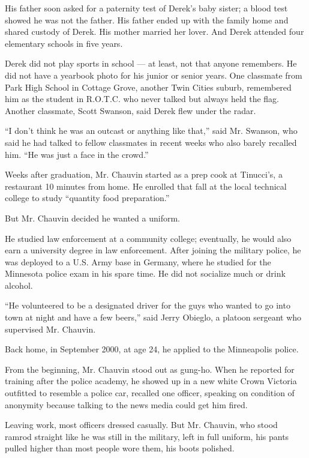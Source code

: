His father soon asked for a paternity test of Derek's baby sister; a
blood test showed he was not the father. His father ended up with the
family home and shared custody of Derek. His mother married her lover.
And Derek attended four elementary schools in five years.

Derek did not play sports in school --- at least, not that anyone
remembers. He did not have a yearbook photo for his junior or senior
years. One classmate from Park High School in Cottage Grove, another
Twin Cities suburb, remembered him as the student in R.O.T.C. who never
talked but always held the flag. Another classmate, Scott Swanson, said
Derek flew under the radar.

``I don't think he was an outcast or anything like that,'' said Mr.
Swanson, who said he had talked to fellow classmates in recent weeks who
also barely recalled him. ``He was just a face in the crowd.''

Weeks after graduation, Mr. Chauvin started as a prep cook at Tinucci's,
a restaurant 10 minutes from home. He enrolled that fall at the local
technical college to study ``quantity food preparation.''

But Mr. Chauvin decided he wanted a uniform.

He studied law enforcement at a community college; eventually, he would
also earn a university degree in law enforcement. After joining the
military police, he was deployed to a U.S. Army base in Germany, where
he studied for the Minnesota police exam in his spare time. He did not
socialize much or drink alcohol.

``He volunteered to be a designated driver for the guys who wanted to go
into town at night and have a few beers,'' said Jerry Obieglo, a platoon
sergeant who supervised Mr. Chauvin.

Back home, in September 2000, at age 24, he applied to the Minneapolis
police.

From the beginning, Mr. Chauvin stood out as gung-ho. When he reported
for training after the police academy, he showed up in a new white Crown
Victoria outfitted to resemble a police car, recalled one officer,
speaking on condition of anonymity because talking to the news media
could get him fired.

Leaving work, most officers dressed casually. But Mr. Chauvin, who stood
ramrod straight like he was still in the military, left in full uniform,
his pants pulled higher than most people wore them, his boots polished.

